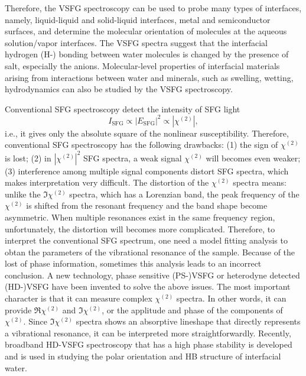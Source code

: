 Therefore, the VSFG spectroscopy can be used to probe many types of interfaces, namely, liquid-liquid and 
solid-liquid interfaces\cite{Guyot-Sionnest1987,RS91,Du93,QD94,Richmond02,Gopalakrishnan2006,ShenYR2006,Morita2008}, metal and semiconductor surfaces\cite{Harris87,Superfine88},
and determine the molecular orientation of molecules at the aqueous solution/vapor interfaces.
The VSFG spectra suggest that the interfacial hydrogen (H-) bonding between water molecules is changed by the presence of salt, 
especially the anions\cite{EAR04}.
Molecular-level properties of interfacial materials arising from interactions between water and minerals, 
such as swelling, wetting, hydrodynamics can also be studied by the VSFG spectroscopy\cite{Rotenberg14}.

Conventional SFG spectroscopy detect the intensity of SFG light
\begin{equation}
I_{\text{SFG}}\propto |E_{\text{SFG}}|^2 \propto |\chi^{(2)}|,
\label{eq:sfg_intensity}
\end{equation}
i.e., it gives only the absolute square of the nonlinear susceptibility. Therefore, conventional SFG spectroscopy has the following drawbacks\cite{Nihonyanagi2013}:
(1) the sign of $\chi^{(2)}$ is lost; 
(2) in $|\chi^{(2)}|^2$ SFG spectra, a weak signal $\chi^{(2)}$  will becomes even weaker;
(3) interference among multiple signal components distort SFG spectra, which makes interpretation very difficult.
The distortion of the $\chi^{(2)}$ spectra means: unlike the $\Im \chi^{(2)}$ spectra, which has a Lorenzian band, the peak frequency of the $\chi^{(2)}$ is shifted from the resonant frequency and the band shape become asymmetric. When multiple resonances exist in the same frequency region, unfortunately, the distortion will becomes more complicated. 
Therefore, to interpret the conventional SFG spectrum, one need a model fitting analysis to obtan the parameters of the vibrational resonance of the sample\cite{Nihonyanagi2013}.
Because of the lost of phase information, sometimes this analysis leads to an incorrect conclusion. 
A new technology, phase sensitive (PS-)VSFG\cite{Ji2008} or heterodyne detected (HD-)VSFG have been invented to solve the above 
issues. The most important character is that it can measure complex $\chi^{(2)}$ spectra. In other words, it can provide $\Re \chi^{(2)}$ and $\Im \chi^{(2)}$,
or the applitude and phase of the components of $\chi^{(2)}$. Since $\Im \chi^{(2)}$ spectra shows an absorptive lineshape that directly represents a vibrational resonance, 
it can be interpreted more straightforwardly\cite{Nihonyanagi2013}.
Recently, broadband HD-VSFG spectroscopy that has a high phase stability is developed and is used in studying the polar orientation and HB structure of interfacial
water\cite{Nihonyanagi2009,Shen2013}. 

